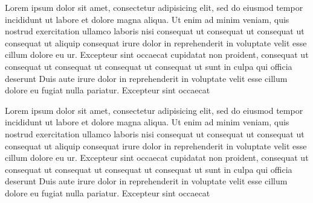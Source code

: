 \documentclass[a4paper, oneside, notitlepage, 12pt]{article}
\title{}
\date{}
\author{}
\begin{document}
\makeatletter

\begin{pairs}

\begin{Rightside}

\beginnumbering
\pstart
Lorem ipsum dolor sit amet, consectetur adipisicing elit,
sed do eiusmod tempor incididunt ut labore et dolore
magna aliqua. Ut enim ad minim veniam, quis nostrud
exercitation ullamco laboris nisi
 consequat ut consequat ut consequat ut consequat ut  aliquip consequat
\pend[\vskip 2\baselineksip]
\pstart
{} irure dolor in reprehenderit
in voluptate velit esse cillum dolore eu ur. Excepteur sint occaecat
cupidatat non proident, consequat ut  consequat ut consequat ut consequat ut consequat ut  sunt in culpa qui officia deserunt
Duis aute irure dolor in reprehenderit
in voluptate velit esse cillum dolore eu fugiat nulla
pariatur. Excepteur sint occaecat
\pend
\endnumbering
\end{Rightside}
\begin{Leftside}
\beginnumbering
\pstart
Lorem ipsum dolor sit amet, consectetur adipisicing elit,
sed do eiusmod tempor incididunt ut labore et dolore
magna aliqua. Ut enim ad minim veniam, quis nostrud
exercitation ullamco laboris nisi
 consequat ut consequat ut consequat ut consequat ut  aliquip consequat
\pend[\vskip 2\baselineksip]
\pstart
{} irure dolor in reprehenderit
in voluptate velit esse cillum dolore eu ur. Excepteur sint occaecat
cupidatat non proident, consequat ut  consequat ut consequat ut consequat ut consequat ut  sunt in culpa qui officia deserunt
Duis aute irure dolor in reprehenderit
in voluptate velit esse cillum dolore eu fugiat nulla
pariatur. Excepteur sint occaecat
\pend
\endnumbering
\end{Leftside}
\Columns
\end{pairs}
\end{document}

